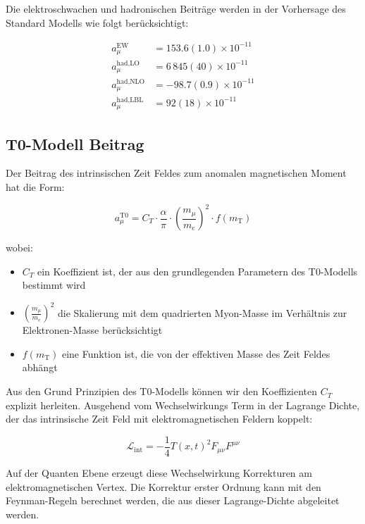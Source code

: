 \documentclass[12pt,a4paper]{article}
\begin{document}
	Die elektroschwachen und hadronischen Beiträge werden in der Vorhersage des Standard Modells wie folgt berücksichtigt:
	
	\begin{align}
		a_\mu^{\text{EW}} &= 153.6(1.0) \times 10^{-11}\\
		a_\mu^{\text{had,LO}} &= 6\,845(40) \times 10^{-11}\\
		a_\mu^{\text{had,NLO}} &= -98.7(0.9) \times 10^{-11}\\
		a_\mu^{\text{had,LBL}} &= 92(18) \times 10^{-11}
	\end{align}
	
	\subsection{T0-Modell Beitrag}
	
	Der Beitrag des intrinsischen Zeit Feldes zum anomalen magnetischen Moment hat die Form:
	
	\begin{equation}
		a_\mu^{\text{T0}} = C_T \cdot \frac{\alpha}{\pi} \cdot \left(\frac{m_\mu}{m_e}\right)^2 \cdot f(m_{\text{T}})
	\end{equation}
	
	wobei:
	\begin{itemize}
		\item $C_T$ ein Koeffizient ist, der aus den grundlegenden Parametern des T0-Modells bestimmt wird
		\item $\left(\frac{m_\mu}{m_e}\right)^2$ die Skalierung mit dem quadrierten Myon-Masse im Verhältnis zur Elektronen-Masse berücksichtigt
		\item $f(m_{\text{T}})$ eine Funktion ist, die von der effektiven Masse des Zeit Feldes abhängt
	\end{itemize}
	
	Aus den Grund Prinzipien des T0-Modells können wir den Koeffizienten $C_T$ explizit herleiten. Ausgehend vom Wechselwirkungs Term in der Lagrange Dichte, der das intrinsische Zeit Feld mit elektromagnetischen Feldern koppelt:
	
	\begin{equation}
		\mathcal{L}_{\text{int}} = -\frac{1}{4}T(x,t)^2 F_{\mu\nu}F^{\mu\nu}
	\end{equation}
	
	Auf der Quanten Ebene erzeugt diese Wechselwirkung Korrekturen am elektromagnetischen Vertex. Die Korrektur erster Ordnung kann mit den Feynman-Regeln berechnet werden, die aus dieser Lagrange-Dichte abgeleitet werden.
	
\end{document}
